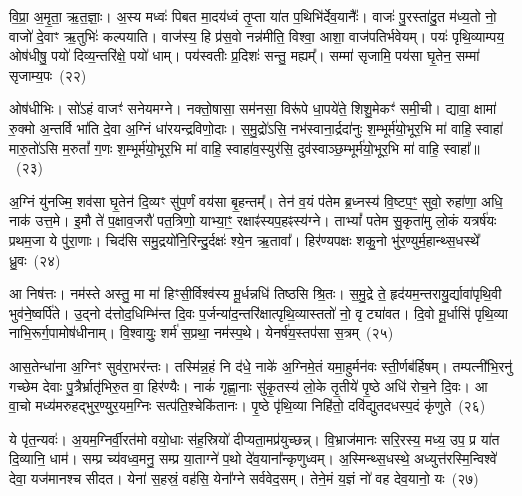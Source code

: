 वि॒प्रा॒ अ॒मृ॒ता॒ ऋ॒त॒ज्ञाः॒। अ॒स्य मध्वः॑ पिबत मा॒दय॑ध्वं तृ॒प्ता या॑त प॒थिभि॑र्देव॒यानैः᳚। वाजः॑ पु॒रस्ता॑दु॒त म॑ध्य॒तो नो॒ वाजो॑ दे॒वाꣳ ऋ॒तुभिः॑ कल्पयाति। वाज॑स्य॒ हि प्र॑स॒वो नन्न॑मीति॒ विश्वा॒ आशा॒ वाज॑पतिर्भवेयम्। पयः॑ पृथि॒व्याम्पय॒ ओष॑धीषु॒ पयो॑ दिव्य॒न्तरि॑क्षे॒ पयो॑ धाम्। पय॑स्वतीः प्र॒दिशः॑ सन्तु॒ मह्यम्᳚। सम्मा॑ सृजामि॒ पय॑सा घृ॒तेन॒ सम्मा॑ सृजाम्य॒पः~(२२)

ओष॑धीभिः। सो॑\-ऽहं वाजꣳ॑ सनेयमग्ने। नक्तो॒षासा॒ सम॑नसा॒ विरू॑पे धा॒पये॑ते॒ शिशु॒मेकꣳ॑ समी॒ची। द्यावा॒ क्षामा॑ रु॒क्मो अ॒न्तर्वि भा॑ति दे॒वा अ॒ग्निं धा॑रयन्द्रविणो॒दाः। स॒मु॒द्रो॑\-ऽसि॒ नभ॑स्वाना॒र्द्रदा॑नुः श॒म्भूर्म॑यो॒भूर॒भि मा॑ वाहि॒ स्वाहा॑ मारु॒तो॑\-ऽसि म॒रुतां᳚ ग॒णः श॒म्भूर्म॑यो॒भूर॒भि मा॑ वाहि॒ स्वाहा॑व॒स्युर॑सि॒ दुव॑स्वाञ्छ॒म्भूर्म॑यो॒भूर॒भि मा॑ वाहि॒ स्वाहा᳚॥~(२३)

{\anuvakamend[{धने᳚ष्व॒पो दुव॑स्वाञ्छ॒म्भूर्म॑यो॒भूर॒भि मा॒ द्वे च॑}]}%

अ॒ग्निं यु॑नज्मि॒ शव॑सा घृ॒तेन॑ दि॒व्यꣳ सु॑प॒र्णं वय॑सा बृ॒हन्तम्᳚। तेन॑ व॒यं प॑तेम ब्र॒ध्नस्य॑ वि॒ष्टप॒ꣳ॒ सुवो॒ रुहा॑णा॒ अधि॒ नाक॑ उत्त॒मे। इ॒मौ ते॑ प॒क्षाव॒जरौ॑ पत॒त्रिणो॒ याभ्या॒ꣳ॒ रक्षाꣴ॑स्यप॒हꣴस्य॑ग्ने। ता\-भ्यां᳚ पतेम सु॒कृता॑मु लो॒कं यत्रर्\mbox{}ष॑यः प्रथम॒जा ये पु॑रा॒णाः। चिद॑सि समु॒द्रयो॑नि॒रिन्दु॒र्दक्षः॑ श्ये॒न ऋ॒तावा᳚। हिर॑ण्यपक्षः शकु॒नो भु॑र॒ण्युर्म॒हान्थ्स॒धस्थे᳚ ध्रु॒वः~(२४)

आ निष॑त्तः। नम॑स्ते अस्तु॒ मा मा॑ हिꣳसी॒र्विश्व॑स्य मू॒र्धन्नधि॑ तिष्ठसि श्रि॒तः। स॒मु॒द्रे ते॒ हृद॑यम॒न्तरायु॒र्द्यावा॑पृथि॒वी भुव॑ने॒ष्वर्पि॑ते। उ॒द्नो द॑त्तोद॒धिम्भि॑न्त दि॒वः प॒र्जन्या॑द॒न्तरि॑क्षात्पृथि॒व्यास्ततो॑ नो॒ वृट्या॑वत। दि॒वो मू॒र्धासि॑ पृथि॒व्या नाभि॒रूर्ग॒पामोष॑धीनाम्। वि॒श्वायुः॒ शर्म॑ स॒प्रथा॒ नम॑स्प॒थे। येनर्\mbox{}ष॑य॒स्तप॑सा स॒त्रम्~(२५)

आस॒तेन्धा॑ना अ॒ग्निꣳ सुव॑रा॒भर॑न्तः। तस्मि॑न्न॒हं नि द॑धे॒ नाके॑ अ॒ग्निमे॒तं यमा॒हुर्मन॑वः स्ती॒र्णब॑र्\mbox{}हिषम्। तम्पत्नी॑भि॒रनु॑ गच्छेम देवाः पु॒त्रैर्भ्रातृ॑भिरु॒त वा॒ हिर॑ण्यैः। नाकं॑ गृह्णा॒नाः सु॑कृ॒तस्य॑ लो॒के तृ॒तीये॑ पृ॒ष्ठे अधि॑ रोच॒ने दि॒वः। आ वा॒चो मध्य॑मरुहद्भुर॒ण्युर॒यम॒ग्निः सत्प॑ति॒श्चेकि॑तानः। पृ॒ष्ठे पृ॑थि॒व्या निहि॑तो॒ दवि॑द्युतदधस्प॒दं कृ॑णुते~(२६)

ये पृ॑त॒न्यवः॑। अ॒यम॒ग्निर्वी॒रत॑मो वयो॒धाः स॑ह॒स्रियो॑ दीप्यता॒मप्र॑युच्छन्न्। वि॒भ्राज॑मानः सरि॒रस्य॒ मध्य॒ उप॒ प्र या॑त दि॒व्यानि॒ धाम॑। सम्प्र च्य॑वध्व॒मनु॒ सम्प्र या॒ताग्ने॑ प॒थो दे॑व॒याना᳚न्कृणुध्वम्। अ॒स्मिन्थ्स॒धस्थे॒ अध्युत्त॑रस्मि॒न्विश्वे॑ देवा॒ यज॑मानश्च सीदत। येना॑ स॒हस्रं॒ वह॑सि॒ येना᳚ग्ने सर्ववेद॒सम्। तेने॒मं य॒ज्ञं नो॑ वह देव॒यानो॒ यः~(२७)

